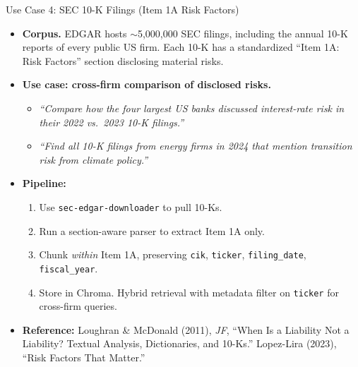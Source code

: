 \begin{frame}{Use Case 4: SEC 10-K Filings (Item 1A Risk Factors)}
\begin{itemize}
\item \textbf{Corpus.} EDGAR hosts $\sim$5{,}000{,}000 SEC filings, including the annual 10-K reports of every public US firm. Each 10-K has a standardized ``Item 1A: Risk Factors'' section disclosing material risks.

\medskip
\item \textbf{Use case: cross-firm comparison of disclosed risks.}
\begin{itemize}
    \item \emph{``Compare how the four largest US banks discussed interest-rate risk in their 2022 vs.\ 2023 10-K filings.''}
    \item \emph{``Find all 10-K filings from energy firms in 2024 that mention transition risk from climate policy.''}
\end{itemize}

\medskip
\item \textbf{Pipeline:}
\begin{enumerate}
    \item Use \texttt{sec-edgar-downloader} to pull 10-Ks.
    \item Run a section-aware parser to extract Item 1A only.
    \item Chunk \emph{within} Item 1A, preserving \texttt{cik}, \texttt{ticker}, \texttt{filing\_date}, \texttt{fiscal\_year}.
    \item Store in Chroma. Hybrid retrieval with metadata filter on \texttt{ticker} for cross-firm queries.
\end{enumerate}

\medskip
\item \textbf{Reference:} Loughran \& McDonald (2011), \emph{JF}, ``When Is a Liability Not a Liability? Textual Analysis, Dictionaries, and 10-Ks.'' Lopez-Lira (2023), ``Risk Factors That Matter.''
\end{itemize}
\end{frame}

